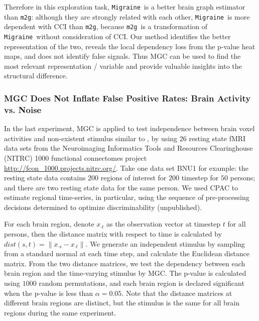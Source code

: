 \documentclass[11pt]{article}
\providecommand{\sct}[1]{{\sc \texttt{#1}}}
\newcommand{\Migraine}{\sct{Migraine}}
\newcommand{\mtg}{\sct{m2g}}
\begin{document}
Therefore in this exploration task, \Migraine~is a better brain graph estimator than \mtg: although they are strongly related with each other, \Migraine~is more dependent with CCI than \mtg, because \mtg~is a transformation of \Migraine~without consideration of CCI. Our method identifies the better representation of the two, reveals the local dependency loss from the p-value heat maps, and does not identify false signals. Thus MGC can be used to find the most relevant representation / variable and provide valuable insights into the structural difference.

\subsubsection{MGC Does Not Inflate False Positive Rates: Brain Activity vs. Noise}

In the last experiment, MGC is applied to test independence between brain voxel activities and non-existent stimulus similar to \cite{EklundKnutsson2012}, by using $26$ resting state fMRI data sets from the Neuroimaging Informatics Tools and Resources Clearinghouse (NITRC) 1000 functional connectomes project \url{http://fcon_1000.projects.nitrc.org/}. Take one data set BNU1 for example: the resting state data contains $200$ regions of interest for $200$ timestep for $50$ persons; and there are two resting state data for the same person. We used CPAC to estimate regional time-series, in particular, using the sequence of pre-processing decisions determined to optimize discriminability (unpublished).

For each brain region, denote $x_{\cdot t}$ as the observation vector at timestep $t$ for all persons, then the distance matrix with respect to time is calculated by $dist(s,t)=\|x_{\cdot s}-x_{\cdot t}\|$. We generate an independent stimulus by sampling from a standard normal at each time step, and calculate the Euclidean distance matrix. From the two distance matrices, we test the dependency between each brain region and the time-varying stimulus by MGC. The p-value is calculated using $1000$ random permutations, and each brain region is declared significant when the p-value is less than $\alpha=0.05$. Note that the distance matrices at different brain regions are distinct, but the stimulus is the same for all brain regions during the same experiment.
\end{document}
